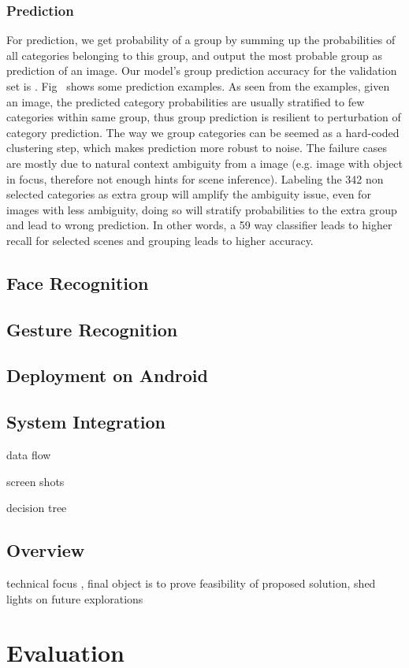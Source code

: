 \subsubsection{Prediction}
For prediction, we get probability of a group by summing up the probabilities of all categories belonging to this group, and output the most probable group as prediction of an image. Our model's group prediction accuracy for the validation set is . Fig~\cite{} shows some prediction examples. As seen from the examples, given an image, the predicted category probabilities are usually stratified to few categories within same group, thus group prediction is resilient to perturbation of category prediction. The way we group categories can be seemed as a hard-coded clustering step, which makes prediction more robust to noise. The failure cases are mostly due to natural context ambiguity from a image (e.g. image with object in focus, therefore not enough hints for scene inference). Labeling the 342 non selected categories as extra group will amplify the ambiguity issue, even for images with less ambiguity, doing so will stratify probabilities to the extra group and lead to wrong prediction. In other words, a 59 way classifier leads to higher recall for selected scenes and grouping leads to higher accuracy.



\subsection{Face Recognition}


\subsection{Gesture Recognition}


\subsection{Deployment on Android}

\subsection{System Integration}

data flow

screen shots

decision tree



\subsection{Overview}
technical focus , final object is to prove feasibility of proposed solution, shed lights on future explorations

\section{Evaluation}


\newpage
